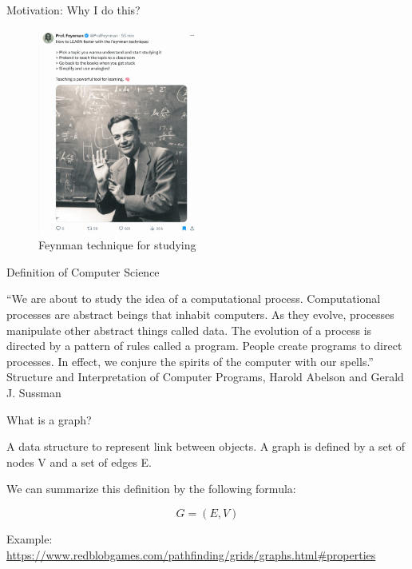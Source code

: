\documentclass[ignorenonframetext,]{beamer}
\begin{document}
\begin{frame}{Motivation: Why I do this?}
\protect\hypertarget{motivation-why-i-do-this}{}

\begin{figure}
\centering
\includegraphics[width=\textwidth,height=2.66667in]{feynman-technique.png}
\caption{Feynman technique for studying}
\end{figure}

\end{frame}

\begin{frame}{Definition of Computer Science}
\protect\hypertarget{definition-of-computer-science}{}

``We are about to study the idea of a computational process.
Computational processes are abstract beings that inhabit computers. As
they evolve, processes manipulate other abstract things called data. The
evolution of a process is directed by a pattern of rules called a
program. People create programs to direct processes. In effect, we
conjure the spirits of the computer with our spells.'' Structure and
Interpretation of Computer Programs, Harold Abelson and Gerald J.
Sussman

\end{frame}

\begin{frame}{What is a graph?}
\protect\hypertarget{what-is-a-graph}{}

A data structure to represent link between objects. A graph is defined
by a set of nodes V and a set of edges E.

We can summarize this definition by the following formula:

\[
G = (E, V)
\]

Example:
\url{https://www.redblobgames.com/pathfinding/grids/graphs.html\#properties}

\end{frame}
\end{document}
